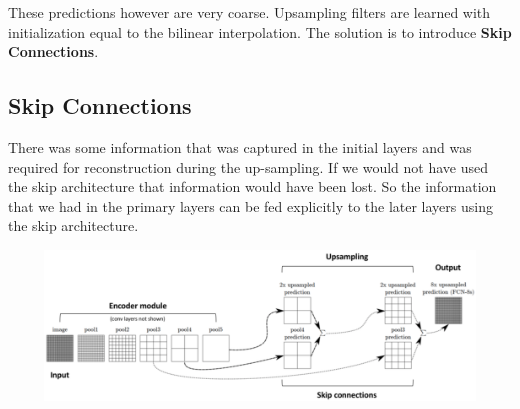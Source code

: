 These predictions however are very coarse. Upsampling filters are learned with initialization equal to the bilinear interpolation. The solution is to introduce \textbf{Skip Connections}.

\subsection{Skip Connections}
There was some information that was captured in the initial layers and was required for reconstruction during the up-sampling. If we would not have used the skip architecture that information would have been lost. So the information that we had in the primary layers can be fed explicitly to the later layers using the skip architecture. \\ 

\begin{minipage}{\linewidth}
        \centering
        \includegraphics[width=14.5cm, height=4cm]{images/skip_connection.png}
\end{minipage} \\

